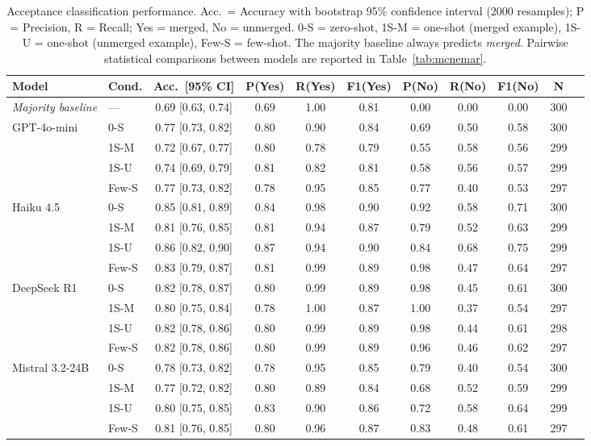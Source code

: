 \begin{table}[t]
\centering
\caption{Acceptance classification performance. Acc.\ = Accuracy with
bootstrap 95\% confidence interval (2000 resamples); P = Precision,
R = Recall; Yes = merged, No = unmerged.
0-S = zero-shot, 1S-M = one-shot (merged example), 1S-U = one-shot
(unmerged example), Few-S = few-shot. The majority baseline always
predicts \emph{merged}. Pairwise statistical comparisons between
models are reported in Table~\ref{tab:mcnemar}.}
\label{tab:acceptance}
\small
\setlength{\tabcolsep}{4pt}
\begin{tabular}{llccccccccc}
\toprule
Model & Cond. & Acc.\ [95\% CI] & P(Yes) & R(Yes) & F1(Yes) & P(No) & R(No) & F1(No) & N \\
\midrule
\textit{Majority baseline} & — & 0.69 [0.63, 0.74] & 0.69 & 1.00 & 0.81 & 0.00 & 0.00 & 0.00 & 300 \\
GPT-4o-mini & 0-S & 0.77 [0.73, 0.82] & 0.80 & 0.90 & 0.84 & 0.69 & 0.50 & 0.58 & 300 \\
 & 1S-M & 0.72 [0.67, 0.77] & 0.80 & 0.78 & 0.79 & 0.55 & 0.58 & 0.56 & 299 \\
 & 1S-U & 0.74 [0.69, 0.79] & 0.81 & 0.82 & 0.81 & 0.58 & 0.56 & 0.57 & 299 \\
 & Few-S & 0.77 [0.73, 0.82] & 0.78 & 0.95 & 0.85 & 0.77 & 0.40 & 0.53 & 297 \\
Haiku 4.5 & 0-S & 0.85 [0.81, 0.89] & 0.84 & 0.98 & 0.90 & 0.92 & 0.58 & 0.71 & 300 \\
 & 1S-M & 0.81 [0.76, 0.85] & 0.81 & 0.94 & 0.87 & 0.79 & 0.52 & 0.63 & 299 \\
 & 1S-U & 0.86 [0.82, 0.90] & 0.87 & 0.94 & 0.90 & 0.84 & 0.68 & 0.75 & 299 \\
 & Few-S & 0.83 [0.79, 0.87] & 0.81 & 0.99 & 0.89 & 0.98 & 0.47 & 0.64 & 297 \\
DeepSeek R1 & 0-S & 0.82 [0.78, 0.87] & 0.80 & 0.99 & 0.89 & 0.98 & 0.45 & 0.61 & 300 \\
 & 1S-M & 0.80 [0.75, 0.84] & 0.78 & 1.00 & 0.87 & 1.00 & 0.37 & 0.54 & 297 \\
 & 1S-U & 0.82 [0.78, 0.86] & 0.80 & 0.99 & 0.89 & 0.98 & 0.44 & 0.61 & 298 \\
 & Few-S & 0.82 [0.78, 0.86] & 0.80 & 0.99 & 0.89 & 0.96 & 0.46 & 0.62 & 297 \\
Mistral 3.2-24B & 0-S & 0.78 [0.73, 0.82] & 0.78 & 0.95 & 0.85 & 0.79 & 0.40 & 0.54 & 300 \\
 & 1S-M & 0.77 [0.72, 0.82] & 0.80 & 0.89 & 0.84 & 0.68 & 0.52 & 0.59 & 299 \\
 & 1S-U & 0.80 [0.75, 0.85] & 0.83 & 0.90 & 0.86 & 0.72 & 0.58 & 0.64 & 299 \\
 & Few-S & 0.81 [0.76, 0.85] & 0.80 & 0.96 & 0.87 & 0.83 & 0.48 & 0.61 & 297 \\
\bottomrule
\end{tabular}
\end{table}
